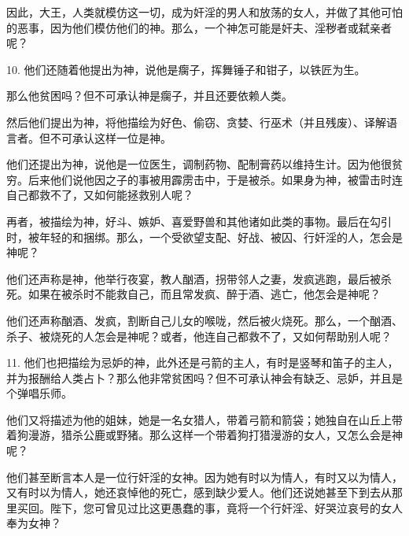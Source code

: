 因此，大王，人类就模仿这一切，成为奸淫的男人和放荡的女人，并做了其他可怕的恶事，因为他们模仿他们的神。那么，一个神怎可能是奸夫、淫秽者或弑亲者呢？\par

10. 他们还随着他提出为神，说他是瘸子，挥舞锤子和钳子，以铁匠为生。\par

那么他贫困吗？但不可承认神是瘸子，并且还要依赖人类。\par

然后他们提出为神，将他描绘为好色、偷窃、贪婪、行巫术（并且残废）、译解语言者。但不可承认这样一位是神。\par

他们还提出为神，说他是一位医生，调制药物、配制膏药以维持生计。因为他很贫穷。后来他们说他因之子的事被用霹雳击中，于是被杀。如果身为神，被雷击时连自己都救不了，又如何能拯救别人呢？\par

再者，被描绘为神，好斗、嫉妒、喜爱野兽和其他诸如此类的事物。最后在勾引时，被年轻的和捆绑。那么，一个受欲望支配、好战、被囚、行奸淫的人，怎会是神呢？\par

他们还声称是神，他举行夜宴，教人酗酒，拐带邻人之妻，发疯逃跑，最后被杀死。如果在被杀时不能救自己，而且常发疯、醉于酒、逃亡，他怎会是神呢？\par

他们还声称酗酒、发疯，割断自己儿女的喉咙，然后被火烧死。那么，一个酗酒、杀子、被烧死的人怎会是神呢？或者，他连自己都救不了，又如何帮助别人呢？\par

11. 他们也把描绘为忌妒的神，此外还是弓箭的主人，有时是竖琴和笛子的主人，并为报酬给人类占卜？那么他非常贫困吗？但不可承认神会有缺乏、忌妒，并且是个弹唱乐师。\par

他们又将描述为他的姐妹，她是一名女猎人，带着弓箭和箭袋；她独自在山丘上带着狗漫游，猎杀公鹿或野猪。那么这样一个带着狗打猎漫游的女人，又怎么会是神呢？\par

他们甚至断言本人是一位行奸淫的女神。因为她有时以为情人，有时又以为情人，又有时以为情人，她还哀悼他的死亡，感到缺少爱人。他们还说她甚至下到去从那里买回。陛下，您可曾见过比这更愚蠢的事，竟将一个行奸淫、好哭泣哀号的女人奉为女神？\par

